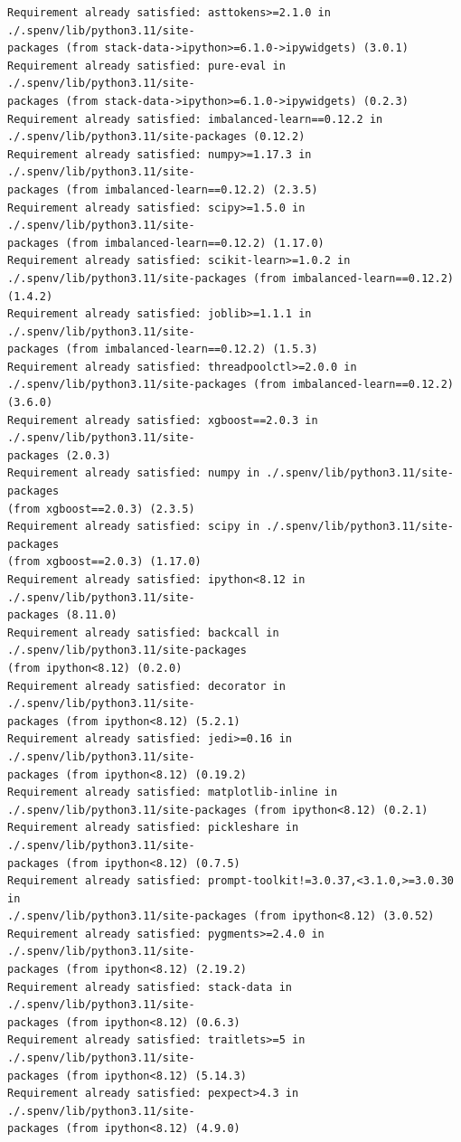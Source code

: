 \documentclass[9pt]{article}
\begin{document}
\begin{Verbatim}[commandchars=\\\{\}]
Requirement already satisfied: asttokens>=2.1.0 in ./.spenv/lib/python3.11/site-
packages (from stack-data->ipython>=6.1.0->ipywidgets) (3.0.1)
Requirement already satisfied: pure-eval in ./.spenv/lib/python3.11/site-
packages (from stack-data->ipython>=6.1.0->ipywidgets) (0.2.3)
Requirement already satisfied: imbalanced-learn==0.12.2 in
./.spenv/lib/python3.11/site-packages (0.12.2)
Requirement already satisfied: numpy>=1.17.3 in ./.spenv/lib/python3.11/site-
packages (from imbalanced-learn==0.12.2) (2.3.5)
Requirement already satisfied: scipy>=1.5.0 in ./.spenv/lib/python3.11/site-
packages (from imbalanced-learn==0.12.2) (1.17.0)
Requirement already satisfied: scikit-learn>=1.0.2 in
./.spenv/lib/python3.11/site-packages (from imbalanced-learn==0.12.2) (1.4.2)
Requirement already satisfied: joblib>=1.1.1 in ./.spenv/lib/python3.11/site-
packages (from imbalanced-learn==0.12.2) (1.5.3)
Requirement already satisfied: threadpoolctl>=2.0.0 in
./.spenv/lib/python3.11/site-packages (from imbalanced-learn==0.12.2) (3.6.0)
Requirement already satisfied: xgboost==2.0.3 in ./.spenv/lib/python3.11/site-
packages (2.0.3)
Requirement already satisfied: numpy in ./.spenv/lib/python3.11/site-packages
(from xgboost==2.0.3) (2.3.5)
Requirement already satisfied: scipy in ./.spenv/lib/python3.11/site-packages
(from xgboost==2.0.3) (1.17.0)
Requirement already satisfied: ipython<8.12 in ./.spenv/lib/python3.11/site-
packages (8.11.0)
Requirement already satisfied: backcall in ./.spenv/lib/python3.11/site-packages
(from ipython<8.12) (0.2.0)
Requirement already satisfied: decorator in ./.spenv/lib/python3.11/site-
packages (from ipython<8.12) (5.2.1)
Requirement already satisfied: jedi>=0.16 in ./.spenv/lib/python3.11/site-
packages (from ipython<8.12) (0.19.2)
Requirement already satisfied: matplotlib-inline in
./.spenv/lib/python3.11/site-packages (from ipython<8.12) (0.2.1)
Requirement already satisfied: pickleshare in ./.spenv/lib/python3.11/site-
packages (from ipython<8.12) (0.7.5)
Requirement already satisfied: prompt-toolkit!=3.0.37,<3.1.0,>=3.0.30 in
./.spenv/lib/python3.11/site-packages (from ipython<8.12) (3.0.52)
Requirement already satisfied: pygments>=2.4.0 in ./.spenv/lib/python3.11/site-
packages (from ipython<8.12) (2.19.2)
Requirement already satisfied: stack-data in ./.spenv/lib/python3.11/site-
packages (from ipython<8.12) (0.6.3)
Requirement already satisfied: traitlets>=5 in ./.spenv/lib/python3.11/site-
packages (from ipython<8.12) (5.14.3)
Requirement already satisfied: pexpect>4.3 in ./.spenv/lib/python3.11/site-
packages (from ipython<8.12) (4.9.0)

\end{Verbatim}
\end{document}
